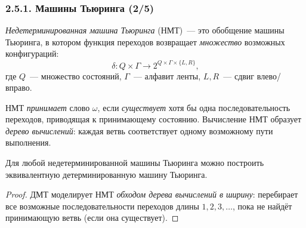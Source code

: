 \documentclass[mathserif,12pt,aspectratio=169]{beamer}
\renewcommand{\index}[1]{}
\def\odmkey#1#2{{\it\color{red} #1}\index{#2}}
\begin{document}
\begin{frame}
\frametitle{2.5.1. Машины Тьюринга (2/5)}

\odmkey{Недетерминированная машина Тьюринга}{Машина!Тьюринга!недетерминированная} (НМТ)~--- 
это обобщение машины Тьюринга, в котором функция переходов 
возвращает \emph{множество} возможных конфигураций:
\[
\delta: Q \times \Gamma \to 2^{Q \times \Gamma \times \{L, R\}},
\]
где $Q$~--- множество состояний, $\Gamma$~--- алфавит ленты, $L, R$~--- сдвиг влево/вправо.

\begin{remark}
НМТ \emph{принимает} слово $\omega$, если \emph{существует} хотя бы одна 
последовательность переходов, приводящая к принимающему состоянию.
Вычисление НМТ образует \odmkey{дерево вычислений}{Дерево!вычислений}: 
каждая ветвь соответствует одному возможному пути выполнения.
\end{remark}

\begin{theorem}
Для любой недетерминированной машины Тьюринга можно построить 
эквивалентную детерминированную машину Тьюринга.
\end{theorem}

\begin{proof}
ДМТ моделирует НМТ \emph{обходом дерева вычислений в ширину}:
перебирает все возможные последовательности переходов длины $1, 2, 3, \ldots$,
пока не найдёт принимающую ветвь (если она существует).
\end{proof}

\end{frame}
\end{document}
